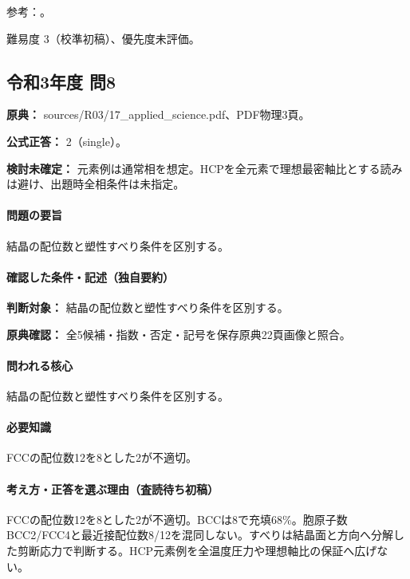 \par 参考：\cite{openstax_crystals}。

\par 難易度 3（校準初稿）、優先度未評価。

\subsection{令和3年度 問8}
\label{q:r03-reg-applied-08}

\noindent\textbf{原典：} sources/R03/17\_applied\_science.pdf、PDF物理3頁。

\textbf{公式正答：} 2（single）。

\par\textbf{検討未確定：} 元素例は通常相を想定。HCPを全元素で理想最密軸比とする読みは避け、出題時全相条件は未指定。

\paragraph{問題の要旨} 結晶の配位数と塑性すべり条件を区別する。

\paragraph{確認した条件・記述（独自要約）}\mbox{}\par

\noindent\textbf{判断対象：} 結晶の配位数と塑性すべり条件を区別する。\par

\noindent\textbf{原典確認：} 全5候補・指数・否定・記号を保存原典22頁画像と照合。\par

\paragraph{問われる核心} 結晶の配位数と塑性すべり条件を区別する。

\paragraph{必要知識} FCCの配位数12を8とした2が不適切。

\paragraph{考え方・正答を選ぶ理由（査読待ち初稿）} FCCの配位数12を8とした2が不適切。BCCは8で充填68\%。胞原子数BCC2/FCC4と最近接配位数8/12を混同しない。すべりは結晶面と方向へ分解した剪断応力で判断する。HCP元素例を全温度圧力や理想軸比の保証へ広げない。

